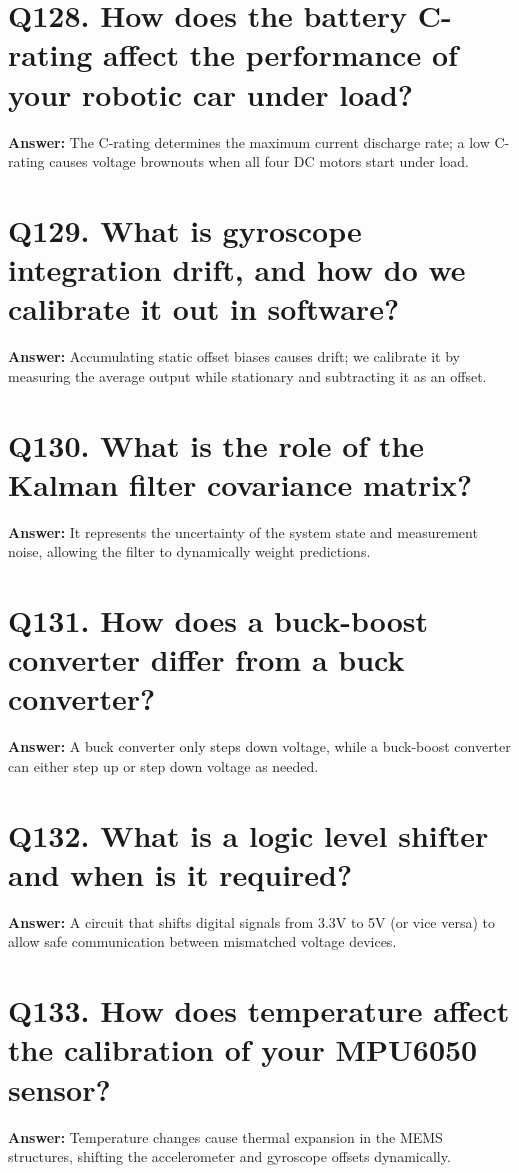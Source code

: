 \documentclass[12pt,a4paper,oneside]{report}
\begin{document}
\section{Q128. How does the battery C-rating affect the performance of your robotic car under load?}
\textbf{Answer:} The C-rating determines the maximum current discharge rate; a low C-rating causes voltage brownouts when all four DC motors start under load.

\section{Q129. What is gyroscope integration drift, and how do we calibrate it out in software?}
\textbf{Answer:} Accumulating static offset biases causes drift; we calibrate it by measuring the average output while stationary and subtracting it as an offset.

\section{Q130. What is the role of the Kalman filter covariance matrix?}
\textbf{Answer:} It represents the uncertainty of the system state and measurement noise, allowing the filter to dynamically weight predictions.

\section{Q131. How does a buck-boost converter differ from a buck converter?}
\textbf{Answer:} A buck converter only steps down voltage, while a buck-boost converter can either step up or step down voltage as needed.

\section{Q132. What is a logic level shifter and when is it required?}
\textbf{Answer:} A circuit that shifts digital signals from 3.3V to 5V (or vice versa) to allow safe communication between mismatched voltage devices.

\section{Q133. How does temperature affect the calibration of your MPU6050 sensor?}
\textbf{Answer:} Temperature changes cause thermal expansion in the MEMS structures, shifting the accelerometer and gyroscope offsets dynamically.
\end{document}
